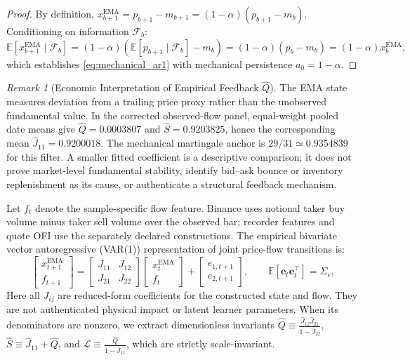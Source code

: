 \documentclass[12pt]{article}
\theoremstyle{definition}
\theoremstyle{remark}
\newtheorem{remark}[theorem]{Remark}
\newcommand{\E}{\mathbb{E}}
\begin{document}
\begin{proof}
By definition, $x_{b+1}^{\text{EMA}} = p_{b+1} - m_{b+1} = (1 - \alpha)(p_{b+1} - m_b)$. Conditioning on information $\mathcal{F}_b$:
\begin{equation}
\mathbb{E}[x_{b+1}^{\text{EMA}} \mid \mathcal{F}_b] = (1 - \alpha) \left( \mathbb{E}[p_{b+1} \mid \mathcal{F}_b] - m_b \right) = (1 - \alpha)(p_b - m_b) = (1 - \alpha) x_b^{\text{EMA}},
\end{equation}
which establishes \eqref{eq:mechanical_ar1} with mechanical persistence $a_0 = 1 - \alpha$.
\end{proof}

\begin{remark}[Economic Interpretation of Empirical Feedback $\hat Q$]
The EMA state measures deviation from a trailing price proxy rather than the unobserved fundamental value. In the corrected observed-flow panel, equal-weight pooled date means give $\hat Q=0.0003807$ and $\hat S=0.9203825$, hence the corresponding mean $\hat J_{11}=0.9200018$. The mechanical martingale anchor is $29/31\simeq0.9354839$ for this filter. A smaller fitted coefficient is a descriptive comparison; it does not prove market-level fundamental stability, identify bid--ask bounce or inventory replenishment as its cause, or authenticate a structural feedback mechanism.
\end{remark}

Let $f_t$ denote the sample-specific flow feature. Binance uses notional taker buy volume minus taker sell volume over the observed bar; recorder features and quote OFI use the separately declared constructions. The empirical bivariate vector autoregressive (VAR(1)) representation of joint price-flow transitions is:
\begin{equation}
\begin{bmatrix} x_{t+1}^{\text{EMA}} \\ f_{t+1} \end{bmatrix} = \begin{bmatrix} J_{11} & J_{12} \\ J_{21} & J_{22} \end{bmatrix} \begin{bmatrix} x_t^{\text{EMA}} \\ f_t \end{bmatrix} + \begin{bmatrix} e_{1, t+1} \\ e_{2, t+1} \end{bmatrix}, \qquad \E[\mathbf{e}_t \mathbf{e}_t^\top] = \Sigma_e,
\label{eq:bivariate_var}
\end{equation}
Here all $J_{ij}$ are reduced-form coefficients for the constructed state and flow. They are not authenticated physical impact or latent learner parameters. When its denominators are nonzero, we extract dimensionless invariants $\hat{Q} \equiv \frac{\hat{J}_{12} \hat{J}_{21}}{1 - \hat{J}_{22}}$, $\hat{S} \equiv \hat{J}_{11} + \hat{Q}$, and $\hat{\mathcal{L}} \equiv \frac{\hat{Q}}{1 - \hat{J}_{11}}$, which are strictly scale-invariant.
\end{document}
